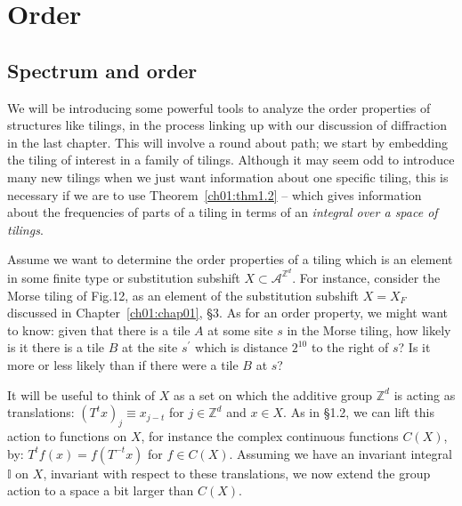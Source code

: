 \documentclass[reqno]{stml-l}
\theoremstyle{plain}
\theoremstyle{definition}
\numberwithin{equation}{chapter}
\begin{document}

\chapter{Order\label{ch03:chap03}}

\section{Spectrum and order}\label{ch03:sec1}

We will be introducing some powerful tools to analyze the order properties of structures like tilings, in the process linking up with our discussion of diffraction in the last chapter. This will involve a round about path; we start by embedding the tiling of interest in a family of tilings. Although it may seem odd to introduce many new tilings when we just want information about one specific tiling, this is necessary if we are to use Theorem~\ref{ch01:thm1.2} -- which gives information about the frequencies of parts of a tiling in terms of an \emph{integral over a space of tilings}.

Assume we want to determine the order properties of a tiling which is an element in some finite type or substitution subshift $X\subset \mathcal{A}^{\mathbb{Z}^{d}}$. For instance, consider the Morse tiling of Fig.12, as an element of the substitution subshift $X=X_{F}$ discussed in Chapter~\ref{ch01:chap01}, \S 3. As for an order property, we might want to know: given that there is a tile $A$ at some site $s$ in the Morse tiling, how likely is it there is a tile $B$ at the site $s^{\prime}$ which is distance $2^{10}$ to the right of $s$? Is it more or less likely than if there were a tile $B$ at $s$?

It will be useful to think of $X$ as a set on which the additive group $\mathbb{Z}^{d}$ is acting as translations: $(T^{t}x)_{j}\equiv x_{j-t}$ for $j\in \mathbb{Z}^{d}$ and $x\in X$. As in \S 1.2, we can lift this action to functions on $X$, for instance the complex continuous functions $C(X)$, by: $T^{t}f(x)=f(T^{-t}x)$ for $f\in C(X)$. Assuming we have an invariant integral $\mathbb{I}$ on $X$, invariant with respect to these translations, we now extend the group action to a space a bit larger than $C(X)$.
\end{document}
